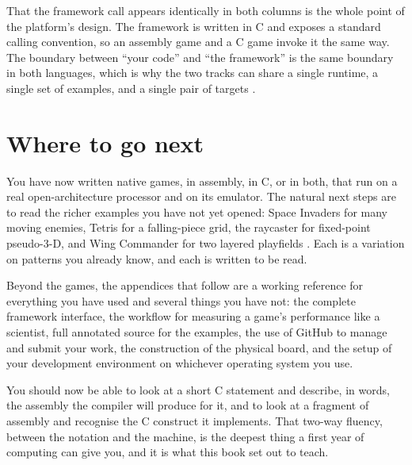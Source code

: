 \begin{prgaside}
That the framework call  appears identically in
both columns is the whole point of the platform's design. The framework is written
in C and exposes a standard \riscv calling convention, so an assembly game and a C
game invoke it the same way. The boundary between ``your code'' and ``the
framework'' is the same boundary in both languages, which is why the two tracks can
share a single runtime, a single set of examples, and a single pair of targets
\citep{prg32abi,prg32teaching}.
\end{prgaside}

\section{Where to go next}

You have now written native \riscv games, in assembly, in C, or in both, that run
on a real open-architecture processor and on its emulator. The natural next steps
are to read the richer examples you have not yet opened: Space Invaders for many
moving enemies, Tetris for a falling-piece grid, the raycaster for fixed-point
pseudo-3-D, and Wing Commander for two layered playfields \citep{prg32repo}. Each is
a variation on patterns you already know, and each is written to be read.

Beyond the games, the appendices that follow are a working reference for everything
you have used and several things you have not: the complete framework interface,
the workflow for measuring a game's performance like a scientist, full annotated
source for the examples, the use of GitHub to manage and submit your work, the
construction of the physical board, and the setup of your development environment
on whichever operating system you use.

\begin{prgcheck}
You should now be able to look at a short C statement and describe, in words, the
assembly the compiler will produce for it, and to look at a fragment of \riscv
assembly and recognise the C construct it implements. That two-way fluency, between
the notation and the machine, is the deepest thing a first year of computing can
give you, and it is what this book set out to teach.
\end{prgcheck}
